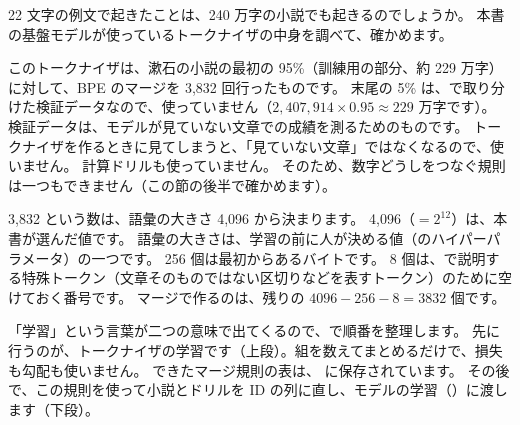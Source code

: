 22 文字の例文で起きたことは、240 万字の小説でも起きるのでしょうか。
本書の基盤モデルが使っているトークナイザの中身を調べて、確かめます。

このトークナイザは、漱石の小説の最初の 95\%（訓練用の部分、約 229 万字）に対して、BPE のマージを 3,832 回行ったものです。
末尾の 5\% は、で取り分けた検証データなので、使っていません（$2{,}407{,}914\times0.95\approx229$ 万字です）。
検証データは、モデルが見ていない文章での成績を測るためのものです。
トークナイザを作るときに見てしまうと、「見ていない文章」ではなくなるので、使いません。
計算ドリルも使っていません。
そのため、数字どうしをつなぐ規則は一つもできません（この節の後半で確かめます）。

3,832 という数は、語彙の大きさ 4,096 から決まります。
4,096（$=2^{12}$）は、本書が選んだ値です。
語彙の大きさは、学習の前に人が決める値（のハイパーパラメータ）の一つです。
256 個は最初からあるバイトです。
8 個は、で説明する特殊トークン（文章そのものではない区切りなどを表すトークン）のために空けておく番号です。
マージで作るのは、残りの $4096-256-8=3832$ 個です。

「学習」という言葉が二つの意味で出てくるので、で順番を整理します。
先に行うのが、トークナイザの学習です（上段）。組を数えてまとめるだけで、損失も勾配も使いません。
できたマージ規則の表は、 に保存されています。
その後で、この規則を使って小説とドリルを ID の列に直し、モデルの学習（）に渡します（下段）。

